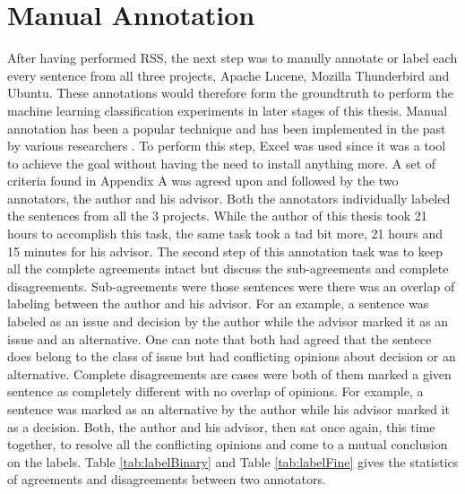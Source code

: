 \documentclass[a4paper,12pt,twoside]{report}
\begin{document}
\section{Manual Annotation}
After having performed RSS, the next step was to manully annotate or label each every sentence from all three projects, Apache Lucene, Mozilla Thunderbird and Ubuntu. These annotations would therefore form the groundtruth to perform the machine learning classification experiments in later stages of this thesis. Manual annotation has been a popular technique and has been implemented in the past by various researchers \cite{Alkadhi2017} \cite{Nonnenmacher2017}. 
\newline \newline 
To perform this step, Excel was used since it was a tool to achieve the goal without having the need to install anything more. A set of criteria found in Appendix A was agreed upon and followed by the two annotators, the author and his advisor. Both the annotators individually labeled the sentences from all the 3 projects. While the author of this thesis took 21 hours to accomplish this task, the same task took a tad bit more, 21 hours and 15 minutes for his advisor. 
\newline \newline 
The second step of this annotation task was to keep all the complete agreements intact but discuss the sub-agreements and complete disagreements. Sub-agreements were those sentences were there was an overlap of labeling between the author and his advisor. For an example, a sentence was labeled as an issue and decision by the author while the advisor marked it as an issue and an alternative. One can note that both had agreed that the sentece does belong to the class of issue but had conflicting opinions about decision or an alternative. 
\newline \newline
Complete disagreements are cases were both of them marked a given sentence as completely different with no overlap of opinions. For example, a sentence was marked as an alternative by the author while his advisor marked it as a decision. Both, the author and his advisor, then sat once again, this time together, to resolve all the conflicting opinions and come to a mutual conclusion on the labels. Table \ref{tab:labelBinary} and Table \ref{tab:labelFine} gives the statistics of agreements and disagreements between two annotators. 
\end{document}

